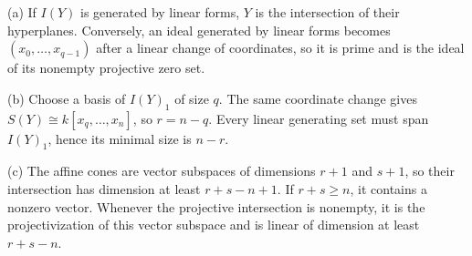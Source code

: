 (a) If $I(Y)$ is generated by linear forms, $Y$ is the intersection of their hyperplanes. Conversely, an ideal generated by linear forms becomes $(x_0,\ldots,x_{q-1})$ after a linear change of coordinates, so it is prime and is the ideal of its nonempty projective zero set.

(b) Choose a basis of $I(Y)_1$ of size $q$. The same coordinate change gives $S(Y)\cong k[x_q,\ldots,x_n]$, so $r=n-q$. Every linear generating set must span $I(Y)_1$, hence its minimal size is $n-r$.

(c) The affine cones are vector subspaces of dimensions $r+1$ and $s+1$, so their intersection has dimension at least $r+s-n+1$. If $r+s\ge n$, it contains a nonzero vector. Whenever the projective intersection is nonempty, it is the projectivization of this vector subspace and is linear of dimension at least $r+s-n$.
